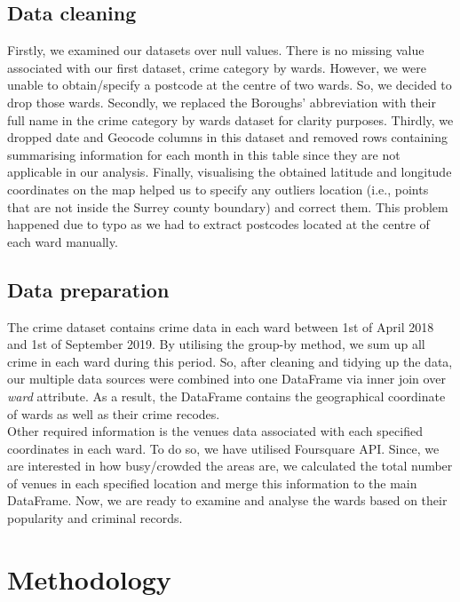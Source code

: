 \documentclass[12pt]{article}
\begin{document}
\subsection{Data cleaning}
Firstly, we examined our datasets over null values. There is no missing value associated with our first dataset, crime category by wards. However, we were unable to obtain/specify a postcode at the centre of two wards. So, we decided to drop those wards. Secondly, we replaced the Boroughs' abbreviation with their full name in the crime category by wards dataset for clarity purposes. Thirdly, we dropped date and Geocode columns in this dataset and removed rows containing summarising information for each month in this table since they are not applicable in our analysis. Finally, visualising the obtained latitude and longitude coordinates on the map helped us to specify any outliers location (i.e.,  points that are not inside the Surrey county boundary) and correct them. This problem happened due to typo as we had to extract postcodes located at the centre of each ward manually. 

\subsection{Data preparation}

The crime dataset contains crime data in each ward between 1st of April 2018 and 1st of September 2019. By utilising the group-by method, we sum up all crime in each ward during this period. So, after cleaning and tidying up the data, our multiple data sources were combined into one DataFrame via inner join over \emph{ward} attribute. As a result, the DataFrame contains the geographical coordinate of wards as well as their crime recodes.
\\\indent Other required information is the venues data associated with each specified coordinates in each ward. To do so, we have utilised Foursquare API.  Since, we are interested in how busy/crowded the areas are, we calculated the total number of venues in each specified location and merge this information to the main DataFrame. Now, we are ready to examine and analyse the wards based on their popularity and criminal records.  


\section{Methodology}
\end{document}
